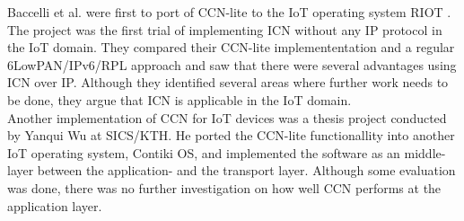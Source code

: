 Baccelli et al. were first to port of CCN-lite to the IoT operating system RIOT \cite{icniotexpinwild}\cite{RIOT}. The project was the first trial of implementing ICN without any IP protocol in the IoT domain. They compared their CCN-lite implemententation and a regular 6LowPAN/IPv6/RPL approach and saw that there were several advantages using ICN over IP. Although they identified several areas where further work needs to be done, they argue that ICN is applicable in the IoT domain.\\
Another implementation of CCN for IoT devices was a thesis project conducted by Yanqui Wu at SICS/KTH\cite{yanqui}. He ported the CCN-lite functionallity into another IoT operating system, Contiki OS, and implemented the software as an middle-layer between the application- and the transport layer. Although some evaluation was done, there was no further investigation on how well CCN performs at the application layer. \\



